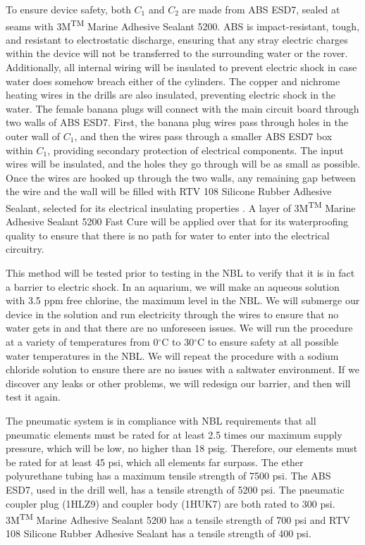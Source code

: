 \documentclass{article}
\begin{document}
To ensure device safety, both $C_1$ and $C_2$ are made from ABS ESD7, sealed at seams with 3M\textsuperscript{TM} Marine Adhesive Sealant 5200. ABS is impact-resistant, tough, and resistant to electrostatic discharge, ensuring that any stray electric charges within the device will not be transferred to the surrounding water or the rover. Additionally, all internal wiring will be insulated to prevent electric shock in case water does somehow breach either of the cylinders. The copper and nichrome heating wires in the drills are also insulated, preventing electric shock in the water. The female banana plugs will connect with the main circuit board through two walls of ABS ESD7. First, the banana plug wires pass through holes in the outer wall of $C_1$, and then the wires pass through a smaller ABS ESD7 box within $C_1$, providing secondary protection of electrical components. The input wires will be insulated, and the holes they go through will be as small as possible. Once the wires are hooked up through the two walls, any remaining gap between the wire and the wall will be filled with RTV 108 Silicone Rubber Adhesive Sealant, selected for its electrical insulating properties\cite{Ann} \cite{Aquino}. A layer of 3M\textsuperscript{TM} Marine Adhesive Sealant 5200 Fast Cure will be applied over that for its waterproofing quality to ensure that there is no path for water to enter into the electrical circuitry. 

This method will be tested prior to testing in the NBL to verify that it is in fact a barrier to electric shock. In an aquarium, we will make an aqueous solution with 3.5 ppm free chlorine, the maximum level in the NBL. We will submerge our device in the solution and run electricity through the wires to ensure that no water gets in and that there are no unforeseen issues. We will run the procedure at a variety of temperatures from 0$^\circ$C to 30$^\circ$C to ensure safety at all possible water temperatures in the NBL. We will repeat the procedure with a sodium chloride solution to ensure there are no issues with a saltwater environment. If we discover any leaks or other problems, we will redesign our barrier, and then will test it again.

The pneumatic system is in compliance with NBL requirements that all pneumatic elements must be rated for at least 2.5 times our maximum supply pressure, which will be low, no higher than 18 psig. Therefore, our elements must be rated for at least 45 psi, which all elements far surpass. The ether polyurethane tubing has a maximum tensile strength of 7500 psi\cite{Poly}. The ABS ESD7, used in the drill well, has a tensile strength of 5200 psi. The pneumatic coupler plug (1HLZ9) and coupler body (1HUK7) are both rated to 300 psi. 3M\textsuperscript{TM} Marine Adhesive Sealant 5200 has a tensile strength of 700 psi and RTV 108 Silicone Rubber Adhesive Sealant has a tensile strength of 400 psi\cite{Momentive}.
\end{document}

